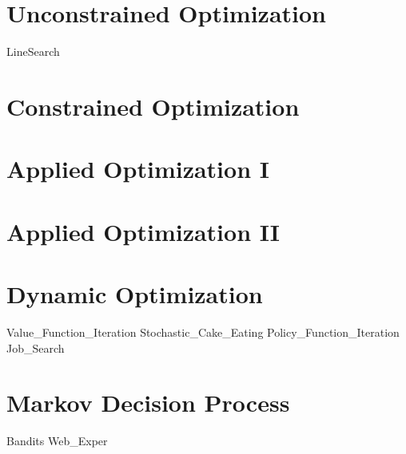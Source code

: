 \documentclass[nociteref]{newsiambook}
\begin{document}
\part{Unconstrained Optimization}
{LineSearch}

\part{Constrained Optimization}

\part{Applied Optimization I}

\part{Applied Optimization II}

\part{Dynamic Optimization}
{Value_Function_Iteration}
{Stochastic_Cake_Eating}
{Policy_Function_Iteration}
{Job_Search}

\part{Markov Decision Process}
{Bandits}
{Web_Exper}
\end{document}
